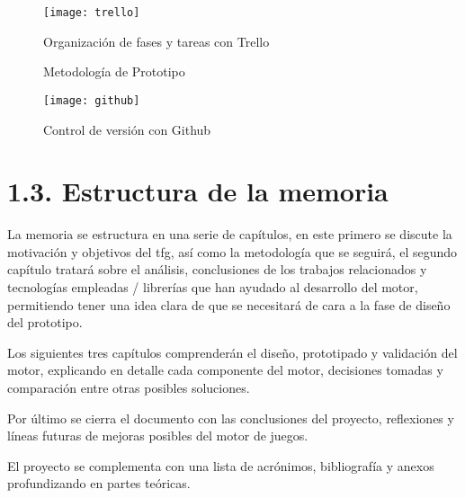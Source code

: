 \begin{figure}[h!]
    \centering
    \texttt{[image: trello]}
    \caption{Organización de fases y tareas con Trello}
    \label{trello_tool}
\end{figure}

\begin{figure}[h!]
    \centering
    \caption{Metodología de Prototipo}
    \label{prototype_methodology}
\end{figure}

\begin{figure}[h!]
    \centering
    \texttt{[image: github]}
    \caption{Control de versión con Github}
    \label{github_tool}
\end{figure}

\clearpage

\section*{1.3. Estructura de la memoria}\label{sec:structure}

La memoria se estructura en una serie de capítulos, en este primero se discute la motivación y objetivos del \gls{tfg},
así como la metodología que se seguirá, el segundo capítulo tratará sobre el análisis, conclusiones de los trabajos
relacionados y tecnologías empleadas / librerías que han ayudado al desarrollo del motor, permitiendo tener una idea clara
de que se necesitará de cara a la fase de diseño del prototipo.

Los siguientes tres capítulos comprenderán el diseño, prototipado y validación del motor, explicando en detalle cada
componente del motor, decisiones tomadas y comparación entre otras posibles soluciones.

Por último se cierra el documento con las conclusiones del proyecto, reflexiones y líneas futuras de mejoras posibles
del motor de juegos.

El proyecto se complementa con una lista de acrónimos, bibliografía y anexos profundizando en partes teóricas.
